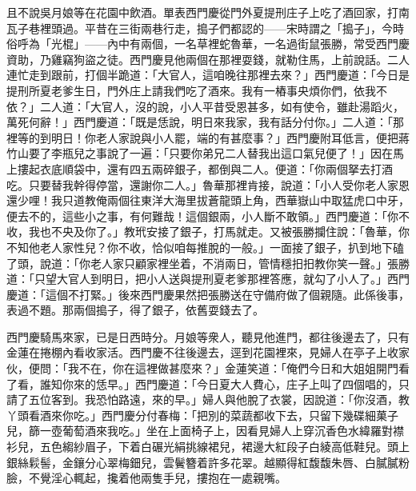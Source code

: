 且不說吳月娘等在花園中飲酒。單表西門慶從門外夏提刑庄子上吃了酒回家，打南瓦子巷裡頭過。平昔在三街兩巷行走，搗子們都認的——宋時謂之「搗子」，今時俗呼為「光棍」——內中有兩個，一名草裡蛇魯華，一名過街鼠張勝，常受西門慶資助，乃雞竊狗盜之徒。西門慶見他兩個在那裡耍錢，就勒住馬，上前說話。二人連忙走到跟前，打個半跪道：「大官人，這咱晚往那裡去來？」西門慶道：「今日是提刑所夏老爹生日，門外庄上請我們吃了酒來。我有一樁事央煩你們，依我不依？」二人道：「大官人，沒的說，小人平昔受恩甚多，如有使令，雖赴湯蹈火，萬死何辭！」西門慶道：「既是恁說，明日來我家，我有話分付你。」二人道：「那裡等的到明日！你老人家說與小人罷，端的有甚麼事？」西門慶附耳低言，便把蔣竹山要了李瓶兒之事說了一遍：「只要你弟兄二人替我出這口氣兒便了！」因在馬上摟起衣底順袋中，還有四五兩碎銀子，都倒與二人。便道：「你兩個拏去打酒吃。只要替我幹得停當，還謝你二人。」魯華那裡肯接，說道：「小人受你老人家恩還少哩！我只道教俺兩個往東洋大海里拔蒼龍頭上角，西華嶽山中取猛虎口中牙，便去不的，這些小之事，有何難哉！這個銀兩，小人斷不敢領。」西門慶道：「你不收，我也不央及你了。」教玳安接了銀子，打馬就走。又被張勝攔住說：「魯華，你不知他老人家性兒？你不收，恰似咱每推脫的一般。」一面接了銀子，扒到地下磕了頭，說道：「你老人家只顧家裡坐着，不消兩日，管情穩抇抇教你笑一聲。」{}張勝道：「只望大官人到明日，把小人送與提刑夏老爹那裡答應，就勾了小人了。」西門慶道：「這個不打緊。」後來西門慶果然把張勝送在守備府做了個親隨。{}此係後事，表過不題。那兩個搗子，得了銀子，依舊耍錢去了。

西門慶騎馬來家，已是日西時分。月娘等衆人，聽見他進門，都往後邊去了，只有金蓮在捲棚內看收家活。西門慶不往後邊去，逕到花園裡來，見婦人在亭子上收家伙，便問：「我不在，你在這裡做甚麼來？」金蓮笑道：「俺們今日和大姐姐開門看了看，誰知你來的恁早。」西門慶道：「今日夏大人費心，庄子上叫了四個唱的，只請了五位客到。我恐怕路遠，來的早。」婦人與他脫了衣裳，因說道：「你沒酒，教丫頭看酒來你吃。」西門慶分付春梅：「把別的菜蔬都收下去，只留下幾碟細菓子兒，篩一壺葡萄酒來我吃。」坐在上面椅子上，因看見婦人上穿沉香色水緯羅對襟衫兒，五色縐紗眉子，下着白碾光絹挑線裙兒，裙邊大紅段子白綾高低鞋兒。頭上銀絲鬏髻，金鑲分心翠梅鈿兒，雲鬢簪着許多花翠。越顯得紅馥馥朱唇、白膩膩粉臉，{}不覺淫心輒起，攙着他兩隻手兒，摟抱在一處親嘴。

